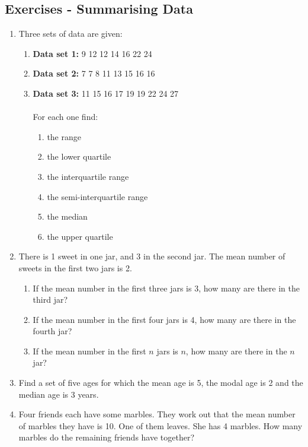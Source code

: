 \documentclass[10pt,a4paper,titlepage,twoside,openright]{report}
\begin{document}
\subsection{Exercises - Summarising Data}
\begin{enumerate}
\item{Three sets of data are given:
\begin{enumerate}
\item{\textbf{Data set 1:} 9 12 12 14 16 22 24}
\item{\textbf{Data set 2:} 7 7 8 11 13 15 16 16} 
\item{\textbf{Data set 3:} 11 15 16 17 19 19 22 24 27}\\\\
For each one find:
\begin{enumerate}
\item{the range}
\item{the lower quartile} 
\item{the interquartile range}
\item{the semi-interquartile range}
\item{the median}
\item{the upper quartile}
\end{enumerate}
\end{enumerate}}

\item{There is 1 sweet in one jar, and 3 in the second jar. The mean number of sweets in the first two jars is 2.
    \begin{enumerate}
    \item If the mean number in the first three jars is 3, how many are there in the third jar?
    \item If the mean number in the first four jars is 4, how many are there in the fourth jar?
    \item If the mean number in the first $n$ jars is $n$, how many are there in the $n$ jar?
    \end{enumerate}}

\item{Find a set of five ages for which the mean age is 5, the modal age is 2 and the median age is 3 years.}

\item{Four friends each have some marbles. They work out that the mean number of marbles they have is 10. One of them leaves. She has 4 marbles. How many marbles do the remaining friends have together?}

\end{enumerate}
\end{document}
